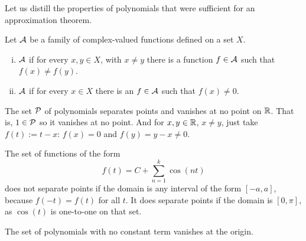 %



Let us distill the properties of polynomials that were sufficient
for an approximation theorem.

\begin{defn}
Let ${\mathcal{A}}$ be a family of complex-valued functions defined on a set $X$.
\begin{enumerate}[(i)]
\item ${\mathcal{A}}$ \emph{}
if for every $x,y \in X$, with $x \not= y$ there is a function $f \in {\mathcal{A}}$ such that
$f(x) \not= f(y)$.
\item 
${\mathcal{A}}$ \emph{} if for every $x \in X$
there is an $f \in {\mathcal{A}}$ such that $f(x) \not= 0$.
\end{enumerate}
\end{defn}

\begin{example}
The set ${\mathcal{P}}$ of polynomials separates points and vanishes at no point
on ${\mathbb{R}}$.  That is, $1 \in {\mathcal{P}}$ so it vanishes at no point.  And for $x,y \in
{\mathbb{R}}$, $x\not= y$, just take $f(t) := t-x$: $f(x) = 0$ and $f(y) = y-x
\not= 0$.
\end{example}

\begin{example}
The set of functions of the form
\begin{equation*}
f(t) = C + \sum_{n=1}^k \cos(nt)
\end{equation*}
does not separate points if the domain is any interval of the form
$[-a,a]$, because $f(-t) = f(t)$ for all $t$.
It does separate points if the domain is $[0,\pi]$, as $\cos(t)$
is one-to-one on that set.
\end{example}

\begin{example}
The set of polynomials with no constant term vanishes at the origin.
\end{example}

